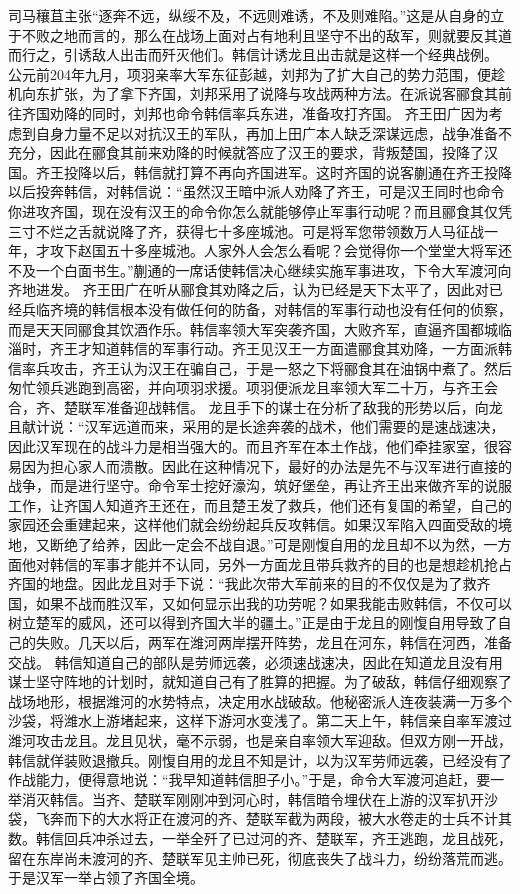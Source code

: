 \documentclass[a4paper,12pt,UTF8,twoside]{ctexbook}
\begin{document}
司马穰苴主张“逐奔不远，纵绥不及，不远则难诱，不及则难陷。”这是从自身的立于不败之地而言的，那么在战场上面对占有地利且坚守不出的敌军，则就要反其道而行之，引诱敌人出击而歼灭他们。韩信计诱龙且出击就是这样一个经典战例。
公元前204年九月，项羽亲率大军东征彭越，刘邦为了扩大自己的势力范围，便趁机向东扩张，为了拿下齐国，刘邦采用了说降与攻战两种方法。在派说客郦食其前往齐国劝降的同时，刘邦也命令韩信率兵东进，准备攻打齐国。
齐王田广因为考虑到自身力量不足以对抗汉王的军队，再加上田广本人缺乏深谋远虑，战争准备不充分，因此在郦食其前来劝降的时候就答应了汉王的要求，背叛楚国，投降了汉国。齐王投降以后，韩信就打算不再向齐国进军。这时齐国的说客蒯通在齐王投降以后投奔韩信，对韩信说：“虽然汉王暗中派人劝降了齐王，可是汉王同时也命令你进攻齐国，现在没有汉王的命令你怎么就能够停止军事行动呢？而且郦食其仅凭三寸不烂之舌就说降了齐，获得七十多座城池。可是将军您带领数万人马征战一年，才攻下赵国五十多座城池。人家外人会怎么看呢？会觉得你一个堂堂大将军还不及一个白面书生。”蒯通的一席话使韩信决心继续实施军事进攻，下令大军渡河向齐地进发。
齐王田广在听从郦食其劝降之后，认为已经是天下太平了，因此对已经兵临齐境的韩信根本没有做任何的防备，对韩信的军事行动也没有任何的侦察，而是天天同郦食其饮酒作乐。韩信率领大军突袭齐国，大败齐军，直逼齐国都城临淄时，齐王才知道韩信的军事行动。齐王见汉王一方面遣郦食其劝降，一方面派韩信率兵攻击，齐王认为汉王在骗自己，于是一怒之下将郦食其在油锅中煮了。然后匆忙领兵逃跑到高密，并向项羽求援。项羽便派龙且率领大军二十万，与齐王会合，齐、楚联军准备迎战韩信。
龙且手下的谋士在分析了敌我的形势以后，向龙且献计说：“汉军远道而来，采用的是长途奔袭的战术，他们需要的是速战速决，因此汉军现在的战斗力是相当强大的。而且齐军在本土作战，他们牵挂家室，很容易因为担心家人而溃散。因此在这种情况下，最好的办法是先不与汉军进行直接的战争，而是进行坚守。命令军士挖好濠沟，筑好堡垒，再让齐王出来做齐军的说服工作，让齐国人知道齐王还在，而且楚王发了救兵，他们还有复国的希望，自己的家园还会重建起来，这样他们就会纷纷起兵反攻韩信。如果汉军陷入四面受敌的境地，又断绝了给养，因此一定会不战自退。”可是刚愎自用的龙且却不以为然，一方面他对韩信的军事才能并不认同，另外一方面龙且带兵救齐的目的也是想趁机抢占齐国的地盘。因此龙且对手下说：“我此次带大军前来的目的不仅仅是为了救齐国，如果不战而胜汉军，又如何显示出我的功劳呢？如果我能击败韩信，不仅可以树立楚军的威风，还可以得到齐国大半的疆土。”正是由于龙且的刚愎自用导致了自己的失败。几天以后，两军在潍河两岸摆开阵势，龙且在河东，韩信在河西，准备交战。
韩信知道自己的部队是劳师远袭，必须速战速决，因此在知道龙且没有用谋士坚守阵地的计划时，就知道自己有了胜算的把握。为了破敌，韩信仔细观察了战场地形，根据潍河的水势特点，决定用水战破敌。他秘密派人连夜装满一万多个沙袋，将潍水上游堵起来，这样下游河水变浅了。第二天上午，韩信亲自率军渡过潍河攻击龙且。龙且见状，毫不示弱，也是亲自率领大军迎敌。但双方刚一开战，韩信就佯装败退撤兵。刚愎自用的龙且不知是计，以为汉军劳师远袭，已经没有了作战能力，便得意地说：“我早知道韩信胆子小。”于是，命令大军渡河追赶，要一举消灭韩信。当齐、楚联军刚刚冲到河心时，韩信暗令埋伏在上游的汉军扒开沙袋，飞奔而下的大水将正在渡河的齐、楚联军截为两段，被大水卷走的士兵不计其数。韩信回兵冲杀过去，一举全歼了已过河的齐、楚联军，齐王逃跑，龙且战死，留在东岸尚未渡河的齐、楚联军见主帅已死，彻底丧失了战斗力，纷纷落荒而逃。于是汉军一举占领了齐国全境。
\end{document}

